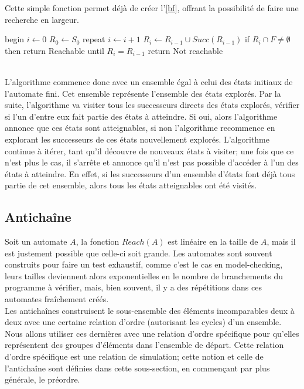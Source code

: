\documentclass[12pt,a4paper,oneside]{book}
\theoremstyle{break}
\theoremstyle{breakplain}
\begin{document}
Cette simple fonction permet déjà de créer l'\autoref{bf}, offrant la possibilité de faire une recherche en largeur.

\pagebreak

\begin{algorithm}[caption={Recherche en largeur \cite{geeraerts2013multiprocessor}},label={bf},mathescape=true]
begin
   $i \leftarrow 0$
   $R_0 \leftarrow S_0$
   repeat
       $i \leftarrow i+1$
       $R_i \leftarrow R_{i-1} \cup Succ(R_{i-1})$
       if $R_i \cap F \neq \emptyset$ then return Reachable
   until $R_i = R_{i-1}$
   return Not reachable
\end{algorithm}
\phantom\\
L'algorithme commence donc avec un ensemble égal à celui des états initiaux de l'automate fini. Cet ensemble représente l'ensemble des états explorés. Par la suite, l'algorithme va visiter tous les successeurs directs des états explorés, vérifier si l'un d'entre eux fait partie des états à atteindre. Si oui, alors l'algorithme annonce que ces états sont atteignables, si non l'algorithme recommence en explorant les successeurs de ces états nouvellement explorés. L'algorithme continue à itérer, tant qu'il découvre de nouveaux états à visiter; une fois que ce n'est plus le cas, il s'arrête et annonce qu'il n'est pas possible d'accéder à l'un des états à atteindre. En effet, si les successeurs d'un ensemble d'états font déjà tous partie de cet ensemble, alors tous les états atteignables ont été visités.



\subsection{Antichaîne}
Soit un automate $A$, la fonction $Reach(A)$ est linéaire en la taille de $A$, mais il est justement possible que celle-ci soit grande. Les automates sont souvent construits pour faire un test exhaustif, comme c'est le cas en model-checking, leurs tailles deviennent alors exponentielles en le nombre de branchements du programme à vérifier, mais, bien souvent, il y a des répétitions dans ces automates fraîchement créés.\\

Les antichaînes construisent le sous-ensemble des éléments incomparables deux à deux avec une certaine relation d'ordre (autorisant les cycles) d'un ensemble. Nous allons utiliser ces dernières avec une relation d'ordre spécifique pour qu'elles représentent des groupes d'éléments dans l'ensemble de départ. Cette relation d'ordre spécifique est une relation de simulation; cette notion et celle de l'antichaîne sont définies dans cette sous-section, en commençant par plus générale, le préordre.\\
\end{document}
